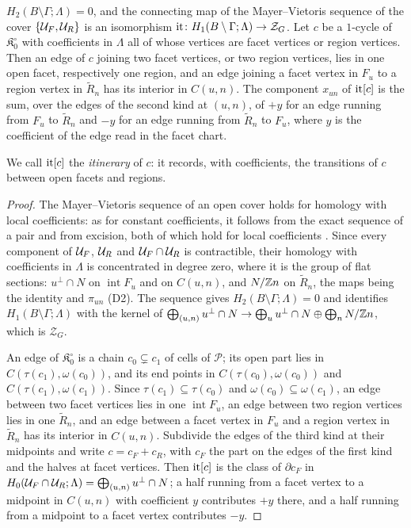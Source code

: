 \begin{lemma}\label{lem:nerve}
$H_2(B\setminus\Gamma;\Lambda)=0$, and the connecting map of the Mayer--Vietoris sequence of the cover
$\{\mathcal U_F,\mathcal U_R\}$ is an isomorphism $\operatorname{it}\colon H_1(B\setminus\Gamma;\Lambda)\to\mathcal Z_G$. Let $c$ be a $1$-cycle of
$\mathfrak K_0^\circ$ with coefficients in $\Lambda$ all of whose vertices are facet vertices or region vertices. Then an edge of $c$
joining two facet vertices, or two region vertices, lies in one open facet, respectively one region, and an edge joining a
facet vertex in $F_u$ to a region vertex in $\widetilde R_n$ has its interior in $C(u,n)$. The component $x_{un}$ of
$\operatorname{it}[c]$ is the sum, over the edges of the second kind at $(u,n)$, of $+y$ for an edge running from $F_u$ to
$\widetilde R_n$ and $-y$ for an edge running from $\widetilde R_n$ to $F_u$, where $y$ is the coefficient of the edge read in
the facet chart.
\end{lemma}

We call $\operatorname{it}[c]$ the \emph{itinerary} of $c$: it records, with coefficients, the transitions of $c$ between open facets and
regions.

\begin{proof}
The Mayer--Vietoris sequence of an open cover holds for homology with local coefficients: as for constant coefficients, it
follows from the exact sequence of a pair and from excision, both of which hold for local coefficients
\cite[\S3.H]{Hat02}. Since every component of
$\mathcal U_F$, $\mathcal U_R$ and $\mathcal U_F\cap\mathcal U_R$ is contractible, their homology with coefficients in $\Lambda$ is concentrated in
degree zero, where it is the group of flat sections: $u^\perp\cap N$ on $\operatorname{int}F_u$ and on $C(u,n)$, and
$N/\mathbb Z n$ on $\widetilde R_n$, the maps being the identity and $\pi_{un}$ (D2). The sequence gives $H_2(B\setminus\Gamma;\Lambda)=0$
and identifies $H_1(B\setminus\Gamma;\Lambda)$ with the kernel of
$\bigoplus_{(u,n)}u^\perp\cap N\to\bigoplus_u u^\perp\cap N\oplus\bigoplus_nN/\mathbb Z n$, which is $\mathcal Z_G$.

An edge of $\mathfrak K_0^\circ$ is a chain $c_0\subsetneq c_1$ of cells of $\mathscr P$; its open part lies in $C(\tau(c_1),\omega(c_0))$, and its
end points in $C(\tau(c_0),\omega(c_0))$ and $C(\tau(c_1),\omega(c_1))$. Since $\tau(c_1)\subseteq\tau(c_0)$ and
$\omega(c_0)\subseteq\omega(c_1)$, an edge between two facet vertices lies in one $\operatorname{int}F_u$, an edge between
two region vertices lies in one $\widetilde R_n$, and an edge between a facet vertex in $F_u$ and a region vertex in
$\widetilde R_n$ has its interior in $C(u,n)$. Subdivide the edges of the third kind at their midpoints and write
$c=c_F+c_R$, with $c_F$ the part on the edges of the first kind and the halves at facet vertices. Then $\operatorname{it}[c]$ is the
class of $\partial c_F$ in $H_0(\mathcal U_F\cap\mathcal U_R;\Lambda)=\bigoplus_{(u,n)}u^\perp\cap N$; a half running from a facet vertex
to a midpoint in $C(u,n)$ with coefficient $y$ contributes $+y$ there, and a half running from a midpoint to a facet
vertex contributes $-y$.
\end{proof}

